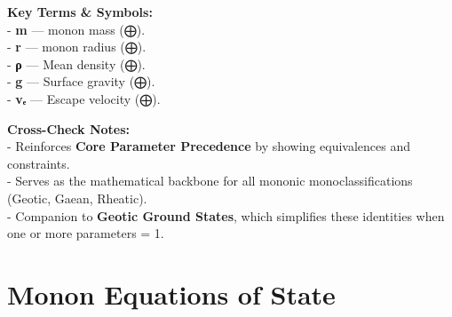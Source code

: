\documentclass[
  letterpaper,
]{book}
\begin{document}
\textbf{Key Terms \& Symbols:}\\
- \textbf{m} --- monon mass (⨁).\\
- \textbf{r} --- monon radius (⨁).\\
- \textbf{ρ} --- Mean density (⨁).\\
- \textbf{g} --- Surface gravity (⨁).\\
- \textbf{vₑ} --- Escape velocity (⨁).

\textbf{Cross-Check Notes:}\\
- Reinforces \textbf{Core Parameter Precedence} by showing equivalences
and constraints.\\
- Serves as the mathematical backbone for all mononic
monoclassifications (Geotic, Gaean, Rheatic).\\
- Companion to \textbf{Geotic Ground States}, which simplifies these
identities when one or more parameters = 1.

\chapter{Monon Equations of State}\label{monon-equations-of-state}
\end{document}
